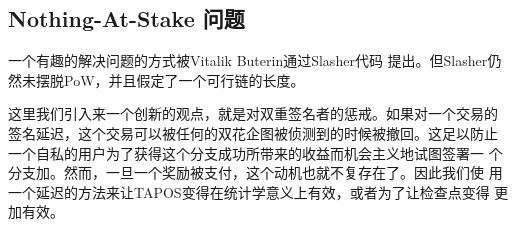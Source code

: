 \documentclass[letterpaper]{article}
\begin{document}

\subsection{Nothing-At-Stake 问题}
一个有趣的解决问题的方式被Vitalik Buterin通过Slasher\cite{Slasher}代码
提出。但Slasher仍然未摆脱PoW，并且假定了一个可行链的长度。

这里我们引入来一个创新的观点，就是对双重签名者的惩戒。如果对一个交易的
签名延迟，这个交易可以被任何的双花企图被侦测到的时候被撤回。这足以防止
一个自私的用户为了获得这个分支成功所带来的收益而机会主义地试图签署一
个分支加。然而，一旦一个奖励被支付，这个动机也就不复存在了。因此我们使
用一个延迟的方法来让TAPOS变得在统计学意义上有效，或者为了让检查点变得
更加有效。
\end{document}
